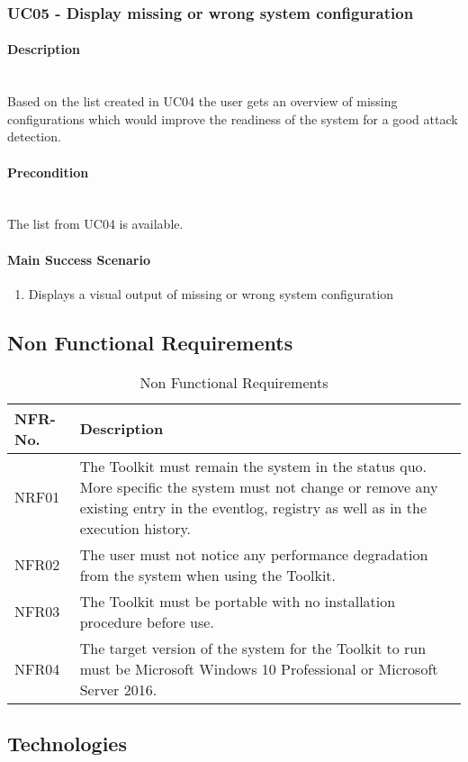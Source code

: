 \subsubsection{UC05 - Display missing or wrong system configuration}
\begin{tcolorbox}
    \paragraph{Description} \ \\
    Based on the list created in UC04 the user gets an overview of missing configurations which would improve the readiness of the system for a good attack detection.
    \ \\
    \paragraph{Precondition} \ \\
    The list from UC04 is available.
    \ \\
    \paragraph{Main Success Scenario} 
    \begin{enumerate}
        \item Displays a visual output of missing or wrong system configuration
    \end{enumerate}   
\end{tcolorbox}



\subsection{Non Functional Requirements}

\begin{table}[H]
    \centering
    \def\arraystretch{2}
    \begin{tabular}{| p{2.5cm} | p{13.5cm} |} \hline
        \textbf{NFR-No.} & \textbf{Description}  \\ \hline
        NRF01 & The Toolkit must remain the system in the status quo. More specific the system must not change or remove any existing entry in the eventlog, registry as well as in the execution history. \\ \hline
        NFR02 & The user must not notice any performance degradation from the system when using the Toolkit. \\ \hline
        NFR03 & The Toolkit must be portable with no installation procedure before use. \\ \hline
        NFR04 & The target version of the system for the Toolkit to run must be Microsoft Windows 10 Professional or Microsoft Server 2016. \\ \hline
    \end{tabular}
    \caption{Non Functional Requirements}
\end{table}

\subsection{Technologies}